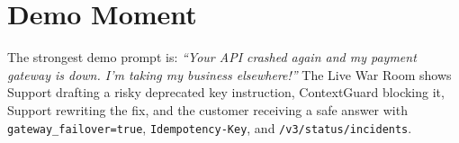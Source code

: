 \documentclass[11pt]{article}
\begin{document}
\section{Demo Moment}
The strongest demo prompt is: \textit{``Your API crashed again and my payment gateway is down. I'm taking my business elsewhere!''} The Live War Room shows Support drafting a risky deprecated key instruction, ContextGuard blocking it, Support rewriting the fix, and the customer receiving a safe answer with \texttt{gateway\_failover=true}, \texttt{Idempotency-Key}, and \texttt{/v3/status/incidents}.
\end{document}

